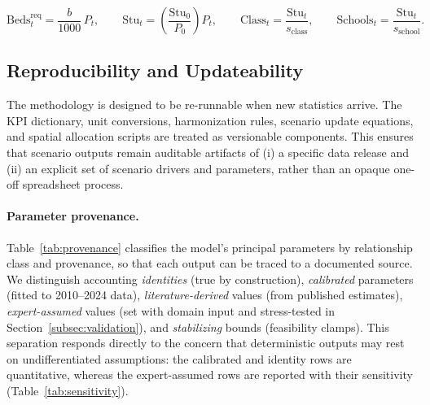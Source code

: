 \documentclass[urbansci,article,submit,pdftex,moreauthors]{Definitions/mdpi}
\begin{document}
\begin{linenomath}
\begin{equation}
\mathrm{Beds}^\mathrm{req}_t = \frac{b}{1000}\,P_t, \qquad
\mathrm{Stu}_t = \left(\frac{\mathrm{Stu}_0}{P_0}\right)P_t, \qquad
\mathrm{Class}_t = \frac{\mathrm{Stu}_t}{s_\mathrm{class}}, \qquad
\mathrm{Schools}_t = \frac{\mathrm{Stu}_t}{s_\mathrm{school}}.
\end{equation}
\end{linenomath}

\subsection{Reproducibility and Updateability}
\label{subsec:reproducibility}

The methodology is designed to be re-runnable when new statistics arrive. The
KPI dictionary, unit conversions, harmonization rules, scenario update
equations, and spatial allocation scripts are treated as versionable
components. This ensures that scenario outputs remain auditable artifacts of
(i) a specific data release and (ii) an explicit set of scenario drivers and
parameters, rather than an opaque one-off spreadsheet process.

\paragraph{Parameter provenance.}
Table~\ref{tab:provenance} classifies the model's principal parameters by
relationship class and provenance, so that each output can be traced to a
documented source. We distinguish accounting \emph{identities} (true by
construction), \emph{calibrated} parameters (fitted to 2010--2024 data),
\emph{literature-derived} values (from published estimates), \emph{expert-assumed}
values (set with domain input and stress-tested in
Section~\ref{subsec:validation}), and \emph{stabilizing} bounds (feasibility
clamps). This separation responds directly to the concern that deterministic
outputs may rest on undifferentiated assumptions: the calibrated and identity
rows are quantitative, whereas the expert-assumed rows are reported with their
sensitivity (Table~\ref{tab:sensitivity}).
\end{document}
